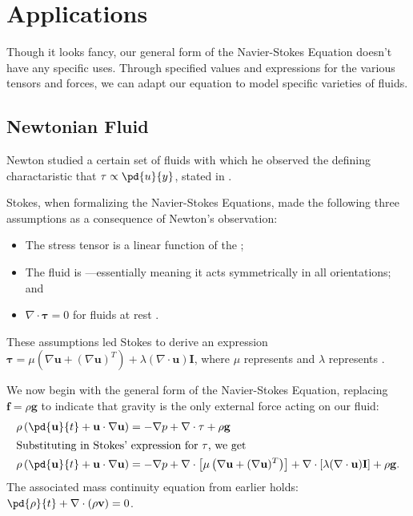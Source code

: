 \documentclass[12pt]{article}
\renewcommand{\vec}[1]{\mathbf{#1}}
\begin{document}
    \section{Applications}
    Though it looks fancy, our general form of the Navier-Stokes Equation doesn't have any specific uses. Through specified values and expressions for the various tensors and forces, we can adapt our equation to model specific varieties of fluids.
    \subsection{Newtonian Fluid}
    Newton studied a certain set of fluids with which he observed the defining charactaristic that $\tau\propto\pd{u}{y}$, stated in .
    \begin{corollary}
        Stokes, when formalizing the Navier-Stokes Equations, made the following three assumptions as a consequence of Newton's observation:
        \begin{itemize}
            \item The stress tensor is a linear function of the ;
            \item The fluid is ---essentially meaning it acts symmetrically in all orientations; and
            \item $\nabla \cdot\vec{\tau}=0$ for fluids at rest \cite{wikiderivation}.
        \end{itemize}
        These assumptions led Stokes to derive an expression $\vec{\tau}=\mu\left( \nabla \vec{u}+(\nabla \vec{u})^T \right) +\lambda(\nabla \cdot\vec{u})\vec{I}$, where $\mu$ represents  and $\lambda$ represents . 
    \end{corollary}

    We now begin with the general form of the Navier-Stokes Equation, replacing  $\vec{f}=\rho\vec{g}$ to indicate that gravity is the only external force acting on our fluid:
    \begin{align*}
        \rho\left( \pd{\vec{u}}{t}+\vec{u}\cdot\nabla \vec{u} \right) &=-\nabla p+\nabla\cdot\vec{\tau}+\rho\vec{g} \\
        \intertext{Substituting in Stokes' expression for $\vec{\tau}$, we get}
        \rho\left( \pd{\vec{u}}{t}+\vec{u}\cdot\nabla \vec{u} \right) &= -\nabla p+\nabla \cdot\left[ \mu\left( \nabla \vec{u}+(\nabla\vec{u})^T \right) \right]+\nabla \cdot\left[ \lambda(\nabla \cdot\vec{u})\vec{I} \right]+\rho\vec{g}
    .\end{align*}
    The associated mass continuity equation from earlier holds: $\pd{\rho}{t}+\nabla \cdot(\rho\vec{v})=0$.
\end{document}

